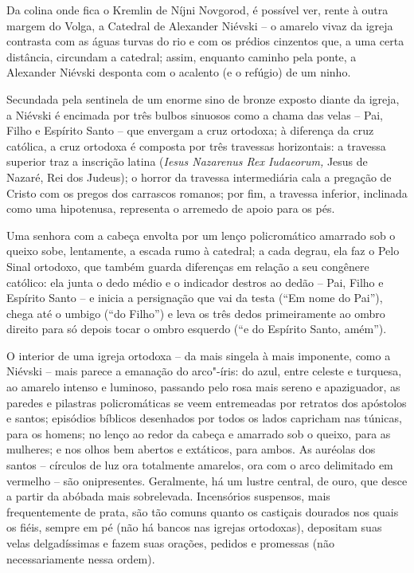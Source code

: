 Da colina onde fica o Kremlin de Níjni Novgorod, é possível ver, rente à
outra margem do Volga, a Catedral de Alexander Niévski -- o amarelo
vivaz da igreja contrasta com as águas turvas do rio e com os prédios
cinzentos que, a uma certa distância, circundam a catedral; assim,
enquanto caminho pela ponte, a Alexander Niévski desponta com o acalento
(e o refúgio) de um ninho.

Secundada pela sentinela de um enorme sino de bronze exposto diante da
igreja, a Niévski é encimada por três bulbos sinuosos como a chama das
velas -- Pai, Filho e Espírito Santo -- que envergam a cruz ortodoxa; à
diferença da cruz católica, a cruz ortodoxa é composta por três
travessas horizontais: a travessa superior traz a inscrição latina
 (\emph{Iesus Nazarenus Rex Iudaeorum,} Jesus de Nazaré, Rei dos
Judeus); o horror da travessa intermediária cala a pregação de Cristo
com os pregos dos carrascos romanos; por fim, a travessa inferior,
inclinada como uma hipotenusa, representa o arremedo de apoio para os
pés.

Uma senhora com a cabeça envolta por um lenço policromático amarrado sob
o queixo sobe, lentamente, a escada rumo à catedral; a cada degrau, ela
faz o Pelo Sinal ortodoxo, que também guarda diferenças em relação a seu
congênere católico: ela junta o dedo médio e o indicador destros ao
dedão -- Pai, Filho e Espírito Santo -- e inicia a persignação que vai
da testa (``Em nome do Pai''), chega até o umbigo (``do Filho'') e leva
os três dedos primeiramente ao ombro direito para só depois tocar o
ombro esquerdo (``e do Espírito Santo, amém'').

O interior de uma igreja ortodoxa -- da mais singela à mais imponente,
como a Niévski -- mais parece a emanação do arco"-íris: do azul, entre
celeste e turquesa, ao amarelo intenso e luminoso, passando pelo rosa
mais sereno e apaziguador, as paredes e pilastras policromáticas se veem
entremeadas por retratos dos apóstolos e santos; episódios bíblicos
desenhados por todos os lados capricham nas túnicas, para os homens; no
lenço ao redor da cabeça e amarrado sob o queixo, para as mulheres; e
nos olhos bem abertos e extáticos, para ambos. As auréolas dos santos --
círculos de luz ora totalmente amarelos, ora com o arco delimitado em
vermelho -- são onipresentes. Geralmente, há um lustre central, de ouro,
que desce a partir da abóbada mais sobrelevada. Incensórios suspensos,
mais frequentemente de prata, são tão comuns quanto os castiçais
dourados nos quais os fiéis, sempre em pé (não há bancos nas igrejas
ortodoxas), depositam suas velas delgadíssimas e fazem suas orações,
pedidos e promessas (não necessariamente nessa ordem).

